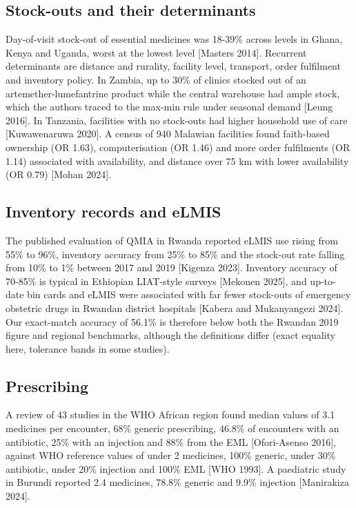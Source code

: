 \documentclass[10pt,a4paper]{article}
\begin{document}
\subsection{Stock-outs and their determinants}
Day-of-visit stock-out of essential medicines was 18-39\% across levels in Ghana, Kenya and Uganda, worst at the lowest level [Masters 2014]. Recurrent determinants are distance and rurality, facility level, transport, order fulfilment and inventory policy. In Zambia, up to 30\% of clinics stocked out of an artemether-lumefantrine product while the central warehouse had ample stock, which the authors traced to the max-min rule under seasonal demand [Leung 2016]. In Tanzania, facilities with no stock-outs had higher household use of care [Kuwawenaruwa 2020]. A census of 940 Malawian facilities found faith-based ownership (OR 1.63), computerisation (OR 1.46) and more order fulfilments (OR 1.14) associated with availability, and distance over 75 km with lower availability (OR 0.79) [Mohan 2024].

\subsection{Inventory records and eLMIS}
The published evaluation of QMIA in Rwanda reported eLMIS use rising from 55\% to 96\%, inventory accuracy from 25\% to 85\% and the stock-out rate falling from 10\% to 1\% between 2017 and 2019 [Kigenza 2023]. Inventory accuracy of 70-85\% is typical in Ethiopian LIAT-style surveys [Mekonen 2025], and up-to-date bin cards and eLMIS were associated with far fewer stock-outs of emergency obstetric drugs in Rwandan district hospitals [Kabera and Mukanyangezi 2024]. Our exact-match accuracy of 56.1\% is therefore below both the Rwandan 2019 figure and regional benchmarks, although the definitions differ (exact equality here, tolerance bands in some studies).

\subsection{Prescribing}
A review of 43 studies in the WHO African region found median values of 3.1 medicines per encounter, 68\% generic prescribing, 46.8\% of encounters with an antibiotic, 25\% with an injection and 88\% from the EML [Ofori-Asenso 2016], against WHO reference values of under 2 medicines, 100\% generic, under 30\% antibiotic, under 20\% injection and 100\% EML [WHO 1993]. A paediatric study in Burundi reported 2.4 medicines, 78.8\% generic and 9.9\% injection [Manirakiza 2024].
\end{document}

